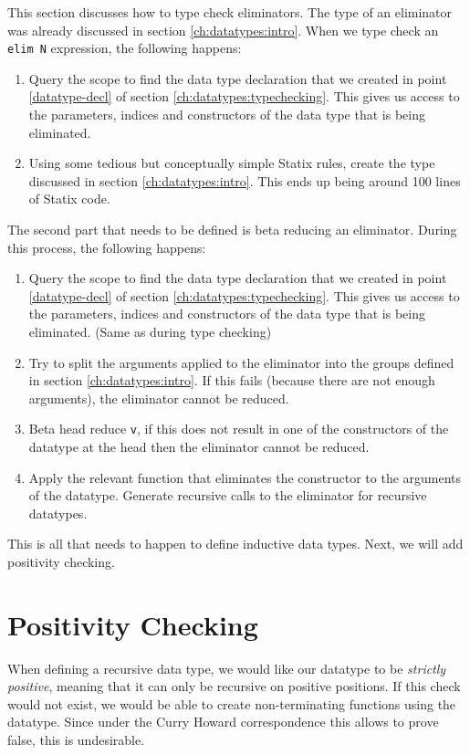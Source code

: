 This section discusses how to type check eliminators. The type of an eliminator was already discussed in section \ref{ch:datatypes:intro}. When we type check an \verb|elim N| expression, the following happens:
\begin{enumerate}
	\item Query the scope to find the data type declaration that we created in point \ref{datatype-decl} of section \ref{ch:datatypes:typechecking}. This gives us access to the parameters, indices and constructors of the data type that is being eliminated. 
	\item Using some tedious but conceptually simple Statix rules, create the type discussed in section \ref{ch:datatypes:intro}. This ends up being around 100 lines of Statix code.
\end{enumerate}

The second part that needs to be defined is beta reducing an eliminator. During this process, the following happens:
\begin{enumerate}
	\item Query the scope to find the data type declaration that we created in point \ref{datatype-decl} of section \ref{ch:datatypes:typechecking}. This gives us access to the parameters, indices and constructors of the data type that is being eliminated. (Same as during type checking)
	\item Try to split the arguments applied to the eliminator into the groups defined in section \ref{ch:datatypes:intro}. If this fails (because there are not enough arguments), the eliminator cannot be reduced.
	\item Beta head reduce \verb|v|, if this does not result in one of the constructors of the datatype at the head then the eliminator cannot be reduced. 
	\item Apply the relevant function that eliminates the constructor to the arguments of the datatype. Generate recursive calls to the eliminator for recursive datatypes.
\end{enumerate}

This is all that needs to happen to define inductive data types. Next, we will add positivity checking.

\section{Positivity Checking}
\label{ch:datatypes:positivity}
	
When defining a recursive data type, we would like our datatype to be \emph{strictly positive}, meaning that it can only be recursive on positive positions. If this check would not exist, we would be able to create non-terminating functions using the datatype. Since under the Curry Howard correspondence this allows to prove false, this is undesirable.

